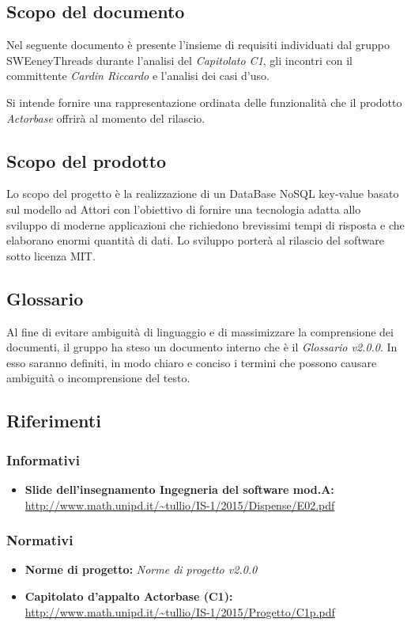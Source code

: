 \documentclass[a4paper]{article}
\begin{document}
	\subsection{Scopo del documento}
		Nel seguente documento è presente l'insieme di requisiti individuati dal gruppo 
		SWEeneyThreads durante l'analisi del \emph{Capitolato C1}, gli incontri con il committente 
		\emph{Cardin Riccardo} e l'analisi dei casi d'uso. 
		
		Si intende fornire una rappresentazione ordinata delle funzionalità che il prodotto \emph{Actorbase} 
		offrirà al momento del rilascio.
	\subsection{Scopo del prodotto}
		Lo scopo del progetto è la realizzazione di un DataBase NoSQL key-value basato sul modello ad 
		Attori con l'obiettivo di fornire una tecnologia adatta allo sviluppo di moderne 
		applicazioni che richiedono brevissimi tempi di risposta e che elaborano enormi quantità 
		di dati. Lo sviluppo porterà al rilascio del software sotto licenza MIT.
	\subsection{Glossario}
		Al fine di evitare ambiguità di linguaggio e di massimizzare la comprensione dei documenti, il 
      gruppo ha steso un documento interno che è il \emph{Glossario v2.0.0}. In esso saranno definiti, in modo
      chiaro e conciso i termini che possono causare ambiguità o incomprensione del testo.
	\subsection{Riferimenti}
	\subsubsection{Informativi}	
		\begin{itemize}
			\item \textbf{Slide dell'insegnamento Ingegneria del software mod.A:} \\
			\url{http://www.math.unipd.it/~tullio/IS-1/2015/Dispense/E02.pdf}
		\end{itemize}
	\subsubsection{Normativi}
		\begin{itemize}
			\item \textbf{Norme di progetto:} \emph{Norme di progetto v2.0.0}
			\item \textbf{Capitolato d'appalto Actorbase (C1):} \\ 
			\url{http://www.math.unipd.it/~tullio/IS-1/2015/Progetto/C1p.pdf}
		\end{itemize}
		
\end{document}
